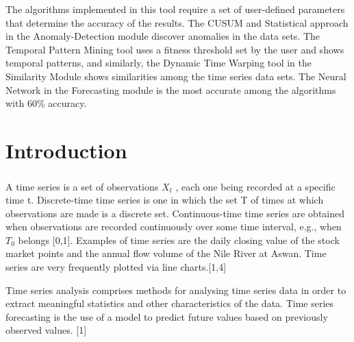 \documentclass[12pt,a4paper]{report}
\begin{document}
The algorithms implemented in this tool require a set of user-defined parameters that determine the accuracy of the results. The CUSUM and Statistical approach in the Anomaly-Detection module discover anomalies in the data sets. The Temporal Pattern Mining tool uses a fitness threshold set by the user and shows temporal patterns, and similarly, the Dynamic Time Warping tool in the Similarity Module shows similarities among the time series data sets. The Neural Network in the Forecasting module is the most accurate among the algorithms with 60\% accuracy. 


\tableofcontents

\newpage
{}
\listoffigures

\newpage

\listoftables
\newpage

\setcounter{page}{1}

\pagestyle{fancy}
\chead{}
\rfoot{\small{\thepage}}
\renewcommand{\headrulewidth}{0.4pt}
\renewcommand{\footrulewidth}{0.4pt}
\linespread{1.5}
\chapter{Introduction}
\paragraph{} A time series is a set of observations $X_t$ , each one being recorded at a specific time t. Discrete-time time series is one in which the set T of times at which observations are made is a discrete set. Continuous-time time series are obtained when observations are recorded continuously over some time interval, e.g., when $T_0$ belongs [0,1]. Examples of time series are the daily closing value of the stock market points and the annual flow volume of the Nile River at Aswan. Time series are very frequently plotted via line charts.[1,4]


 Time series analysis comprises methods for analysing time series data in order to extract meaningful statistics and other characteristics of the data. Time series forecasting is the use of a model to predict future values based on previously observed values. [1] 
\end{document}
